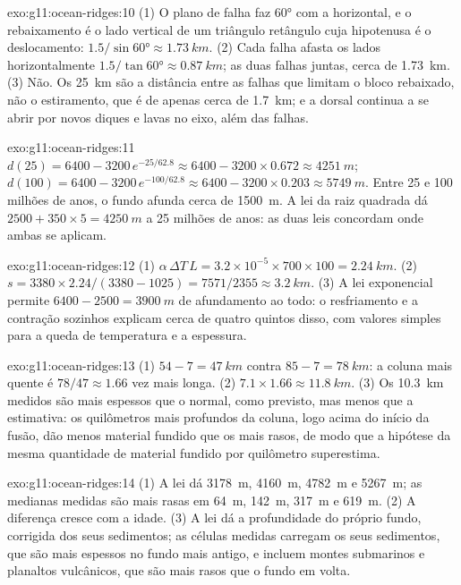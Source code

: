 \begin{solution}{exo:g11:ocean-ridges:10}
(1) O plano de falha faz \ang{60} com a horizontal, e o rebaixamento é o
lado vertical de um triângulo retângulo cuja hipotenusa é o deslocamento:
$1.5/\sin\ang{60} \approx \qty{1.73}{km}$. (2) Cada falha afasta os lados
horizontalmente $1.5/\tan\ang{60} \approx \qty{0.87}{km}$; as duas falhas
juntas, cerca de \qty{1.73}{km}. (3) Não. Os \qty{25}{km} são a distância
entre as falhas que limitam o bloco rebaixado, não o estiramento, que é de
apenas cerca de \qty{1.7}{km}; e a dorsal continua a se abrir por novos
diques e lavas no eixo, além das falhas.
\end{solution}

\begin{solution}{exo:g11:ocean-ridges:11}
$d(25) = 6400 - 3200\,e^{-25/62.8} \approx 6400 - 3200 \times 0.672 \approx
\qty{4251}{m}$; $d(100) = 6400 - 3200\,e^{-100/62.8} \approx 6400 - 3200
\times 0.203 \approx \qty{5749}{m}$. Entre 25 e 100 milhões de anos, o
fundo afunda cerca de \qty{1500}{m}. A lei da raiz quadrada dá
$2500 + 350 \times 5 = \qty{4250}{m}$ a 25 milhões de anos: as duas leis
concordam onde ambas se aplicam.
\end{solution}

\begin{solution}{exo:g11:ocean-ridges:12}
(1) $\alpha\,\Delta T\,L = 3.2 \times 10^{-5} \times 700 \times 100 =
\qty{2.24}{km}$. (2) $s = 3380 \times 2.24/(3380 - 1025) = 7571/2355 \approx
\qty{3.2}{km}$. (3) A lei exponencial permite $6400 - 2500 =
\qty{3900}{m}$ de afundamento ao todo: o resfriamento e a contração sozinhos
explicam cerca de quatro quintos disso, com valores simples para a queda de
temperatura e a espessura.
\end{solution}

\begin{solution}{exo:g11:ocean-ridges:13}
(1) $54 - 7 = \qty{47}{km}$ contra $85 - 7 = \qty{78}{km}$: a coluna mais
quente é $78/47 \approx 1.66$ vez mais longa. (2) $7.1 \times 1.66 \approx
\qty{11.8}{km}$. (3) Os \qty{10.3}{km} medidos são mais espessos que o
normal, como previsto, mas menos que a estimativa: os quilômetros mais
profundos da coluna, logo acima do início da fusão, dão menos material
fundido que os mais rasos, de modo que a hipótese da mesma quantidade de
material fundido por quilômetro superestima.
\end{solution}

\begin{solution}{exo:g11:ocean-ridges:14}
(1) A lei dá \qty{3178}{m}, \qty{4160}{m}, \qty{4782}{m} e
\qty{5267}{m}; as medianas medidas são mais rasas em \qty{64}{m},
\qty{142}{m}, \qty{317}{m} e \qty{619}{m}. (2) A diferença cresce com a
idade. (3) A lei dá a profundidade do próprio fundo, corrigida dos seus
sedimentos; as células medidas carregam os seus sedimentos, que são mais
espessos no fundo mais antigo, e incluem montes submarinos e planaltos
vulcânicos, que são mais rasos que o fundo em volta.
\end{solution}

